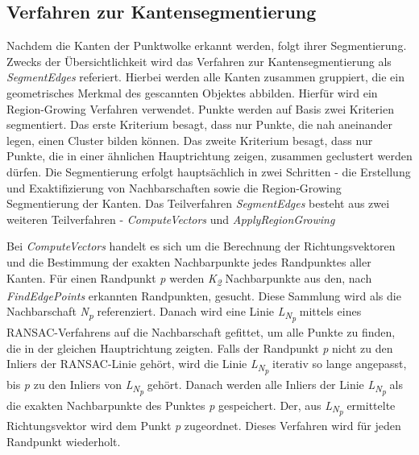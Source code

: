 \subsection{Verfahren zur Kantensegmentierung} \label{edge_segmentation}
Nachdem die Kanten der Punktwolke erkannt werden, folgt ihrer Segmentierung. Zwecks der Übersichtlichkeit wird das Verfahren zur Kantensegmentierung als \textit{SegmentEdges} referiert. Hierbei werden alle Kanten zusammen gruppiert, die ein geometrisches Merkmal des gescannten Objektes abbilden. Hierfür wird ein Region-Growing Verfahren verwendet. Punkte werden auf Basis zwei Kriterien segmentiert. Das erste Kriterium besagt, dass nur Punkte, die nah aneinander legen, einen Cluster bilden können. Das zweite Kriterium besagt, dass nur Punkte, die in einer ähnlichen Hauptrichtung zeigen, zusammen geclustert werden dürfen. Die Segmentierung erfolgt hauptsächlich in zwei Schritten - die Erstellung und Exaktifizierung von Nachbarschaften sowie die Region-Growing Segmentierung der Kanten. Das Teilverfahren \textit{SegmentEdges} besteht aus zwei weiteren Teilverfahren - \textit{ComputeVectors} und \textit{ApplyRegionGrowing}

Bei \textit{ComputeVectors} handelt es sich um die Berechnung der Richtungsvektoren und die Bestimmung der exakten Nachbarpunkte jedes Randpunktes aller Kanten. Für einen Randpunkt \textit{p} werden \textit{K\textsubscript{2}} Nachbarpunkte aus den, nach \textit{FindEdgePoints} erkannten Randpunkten, gesucht. Diese Sammlung wird als die Nachbarschaft \textit{N\textsubscript{p}} referenziert. Danach wird eine Linie \textit{L\textsubscript{N\textsubscript{p}}} mittels eines RANSAC-Verfahrens auf die Nachbarschaft gefittet, um alle Punkte zu finden, die in der gleichen Hauptrichtung zeigten. Falls der Randpunkt \textit{p} nicht zu den Inliers der RANSAC-Linie gehört, wird die Linie \textit{L\textsubscript{N\textsubscript{p}}} iterativ so lange angepasst, bis \textit{p} zu den Inliers von \textit{L\textsubscript{N\textsubscript{p}}} gehört. Danach werden alle Inliers der Linie \textit{L\textsubscript{N\textsubscript{p}}} als die exakten Nachbarpunkte des Punktes \textit{p} gespeichert. Der, aus \textit{L\textsubscript{N\textsubscript{p}}} ermittelte Richtungsvektor wird dem Punkt \textit{p} zugeordnet. Dieses Verfahren wird für jeden Randpunkt wiederholt.

